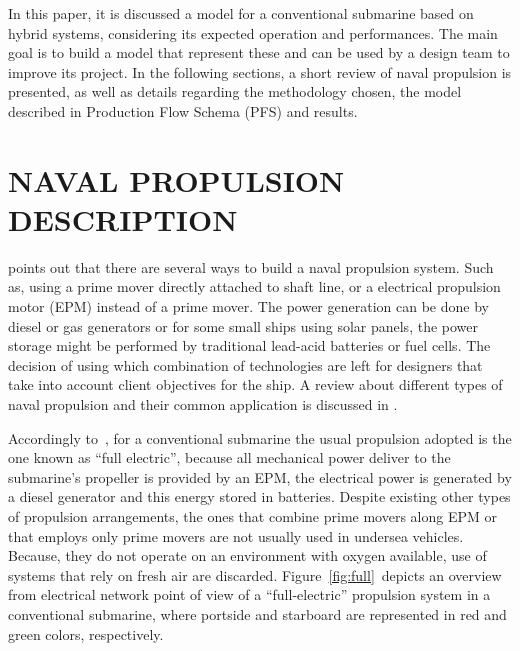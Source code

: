 \documentclass[10pt,fleqn,a4paper,twoside]{article}
\begin{document}
	In this paper, it is discussed a model for a conventional submarine based on hybrid systems, considering its expected operation and performances. The main goal is to build a model that represent these and can be used by a design team to improve its project. In the following sections, a short review of naval propulsion is presented, as well as details regarding the methodology chosen, the model described in Production Flow Schema (PFS) and results.

	\section{NAVAL PROPULSION DESCRIPTION}
	\label{sec:naval}
	\citet{Geertsma2017} points out that there are several ways to build a naval propulsion system. Such as, using a prime mover directly attached to shaft line, or a electrical propulsion motor (EPM) instead of a prime mover. The power generation can be done by diesel or gas generators or for some small ships using solar panels, the power storage might be performed by traditional lead-acid batteries or fuel cells. The decision of using which combination of technologies are left for designers that take into account client objectives for the ship. A review about different types of naval propulsion and their common application is discussed in \citet{Geertsma2017}.

	Accordingly to~\citet{Pereira2016}, for a conventional submarine the usual propulsion adopted is the one known as ``full electric'', because all mechanical power deliver to the submarine's propeller is provided by an EPM, the electrical power is generated by a diesel generator and this energy stored in batteries. Despite existing other types of propulsion arrangements, the ones that combine prime movers along EPM or that employs only prime movers are not usually used in undersea vehicles. Because, they do not operate on an environment with oxygen available, use of systems that rely on fresh air are discarded. Figure~\ref{fig:full}\ depicts an overview from electrical network point of view of a ``full-electric'' propulsion system in a conventional submarine, where portside and starboard are represented in red and green colors, respectively.
\end{document}
